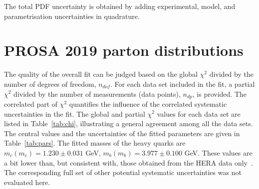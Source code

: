 \documentclass[12pt]{article}
\begin{document}
The total PDF uncertainty is obtained by adding experimental, model, and parametrisation  uncertainties in quadrature.


%
%


\section{PROSA 2019 parton distributions}
\label{sec:results}

The quality of the overall fit can be judged based on the global $\chi^2$ divided by the number of degrees of freedom, $n_{dof}$. For each data set included in the fit, a partial $\chi^2$
divided by the number of measurements (data points), $n_{dp}$, is provided. The correlated part of $\chi^2$ quantifies the influence of the correlated systematic uncertainties in the fit. The global and partial $\chi^2$ values for each data set are listed in Table~\ref{tab:chi}, illustrating a general agreement among all the data sets. The central values and the uncertainties of the fitted parameters are given in Table~\ref{tab:pars}. 
The fitted masses of the heavy quarks are $m_c(m_c) = 1.230 \pm 0.031$ GeV, $m_b(m_b) = 3.977 \pm 0.100$ GeV. These values are a bit lower than, but consistent with, those obtained from the HERA data only~\cite{H1:2018flt}.
The corresponding full set of other potential systematic uncertainties was not evaluated here.
\end{document}
